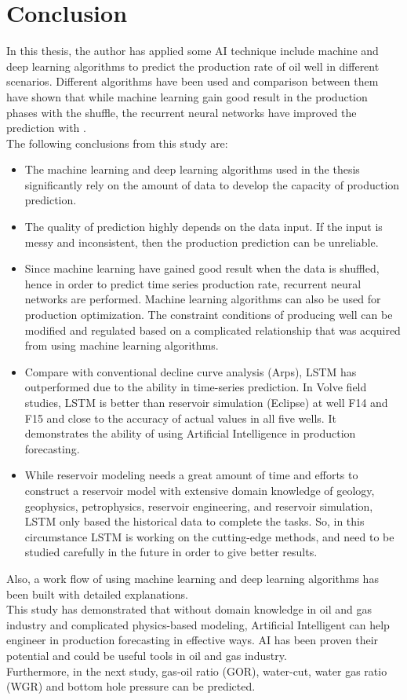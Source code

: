 \documentclass[12pt,a4paper]{report}
\begin{document}
\chapter{Conclusion}
In this thesis, the author has applied some AI technique include machine and deep learning algorithms to predict the production rate of oil well in different scenarios. Different algorithms have been used and comparison between them have shown that while machine learning gain good result in the production phases with the shuffle, the recurrent neural networks have improved the prediction with .\\
The following conclusions from this study are:
\begin{itemize}
	\item The machine learning and deep learning algorithms used in the thesis significantly rely on the amount of data to develop the capacity of production prediction.
	\item The quality of prediction highly depends on the data input. If the input is messy and inconsistent, then the production prediction can be unreliable.
	\item Since machine learning have gained good result when the data is shuffled, hence in order to predict time series production rate, recurrent neural networks are performed. Machine learning algorithms can also be used for production optimization. The constraint conditions of producing well can be modified and regulated based on a complicated relationship that was acquired from using machine learning algorithms. 
	\item Compare with conventional decline curve analysis (Arps), LSTM has outperformed due to the ability in time-series prediction. In Volve field studies, LSTM is better than reservoir simulation (Eclipse) at well F14 and F15 and close to the accuracy of actual values in all five wells. It demonstrates the ability of using Artificial Intelligence in production forecasting.
	\item While reservoir modeling needs a great amount of time and efforts to construct a reservoir model with extensive domain knowledge of geology, geophysics, petrophysics, reservoir engineering, and reservoir simulation, LSTM only based the historical data to complete the tasks. So, in this circumstance LSTM is working on the cutting-edge methods, and need to be studied carefully in the future in order to give better results. 
\end{itemize}
Also, a work flow of using machine learning and deep learning algorithms has been built with detailed explanations.\\
This study has demonstrated that without domain knowledge in oil and gas industry and complicated physics-based modeling, Artificial Intelligent can help engineer in production forecasting in effective ways. AI has been proven their potential and could be useful tools in oil and gas industry.\\
Furthermore, in the next study, gas-oil ratio (GOR), water-cut, water gas ratio (WGR) and bottom hole pressure can be predicted.
\end{document}
